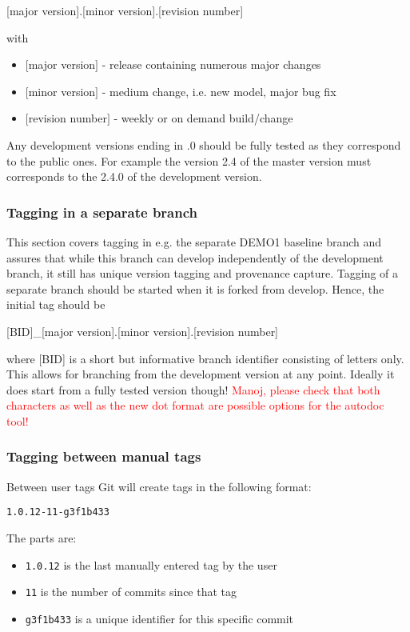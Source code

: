\documentclass[11pt,a4paper]{report}
\begin{document}
\begin{center}
	[major version].[minor version].[revision number]
\end{center}
with 
\begin{itemize}
	\item $[$major version$]$ - release containing numerous major changes
	\item $[$minor version$]$ - medium change, i.e. new model, major bug fix
	\item $[$revision number$]$ - weekly or on demand build/change 
\end{itemize}

Any development versions ending in .0 should be fully tested as they correspond to the public ones. For example the version 2.4 of the master version must corresponds to the 2.4.0 of the development version.


\subsubsection{Tagging in a separate branch}
This section covers tagging in e.g. the separate DEMO1 baseline branch and assures that while this branch can develop independently of the development branch, it still has unique version tagging and provenance capture. Tagging of a separate branch should be started when it is forked from develop. Hence, the initial tag should be 

\begin{center}
	[BID]\_[major version].[minor version].[revision number]
\end{center}
where [BID] is a short but informative branch identifier consisting of letters only. This allows for branching from the development version at any point. Ideally it does start from a fully tested version though!\newline
\textcolor{red}{Manoj, please check that both characters as well as the new dot format are possible options for the autodoc tool!}

\subsubsection{Tagging between manual tags}
Between user tags Git will create tags in the following format:

\texttt{1.0.12-11-g3f1b433}

The parts are:
\begin{itemize}
  \item \texttt{1.0.12} is the last manually entered tag by the user
  \item \texttt{11} is the number of commits since that tag
  \item \texttt{g3f1b433} is a unique identifier for this specific commit
\end{itemize}
\end{document}
